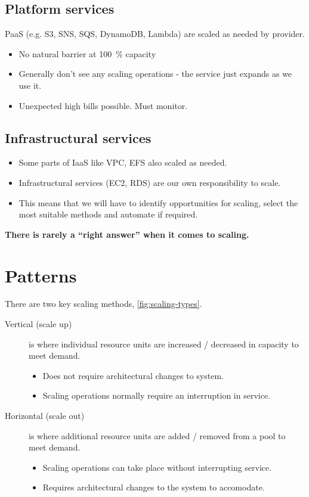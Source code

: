 \documentclass[slides]{pgnotes}
\begin{document}
\subsection{Platform services}

PaaS (e.g. S3, SNS, SQS, DynamoDB, Lambda) are scaled as needed by provider.
\begin{itemize}
\item No natural barrier at \SI{100}{\percent} capacity
\item Generally don't see any scaling operations - the service just expands as we use it.
\item Unexpected high bills possible.  Must monitor.
\end{itemize}

\subsection{Infrastructural services}

\begin{itemize}
\item Some parts of IaaS like VPC, EFS also scaled as needed.
\item Infrastructural services (EC2, RDS) are our own responsibility to scale.
\item This means that we will have to identify opportunities for scaling, select the most suitable methods and automate if required.
\end{itemize}

\begin{center}
\textbf{There is rarely a ``right answer'' when it comes to scaling.}
\end{center}

\newpage

\section{Patterns}

There are two key scaling methods, \autoref{fig:scaling-types}.


\begin{description}
\item[Vertical (scale up)] is where individual resource units are increased / decreased in capacity to meet demand.
  \begin{itemize}
  \item Does not require architectural changes to system.
  \item Scaling operations normally require an interruption in service.
  \end{itemize}
\item[Horizontal (scale out)] is where additional resource units are added / removed from a pool to meet demand.
  \begin{itemize}
  \item Scaling operations can take place without interrupting service.
  \item Requires architectural changes to the system to accomodate.
  \end{itemize}
\end{description}
\end{document}

